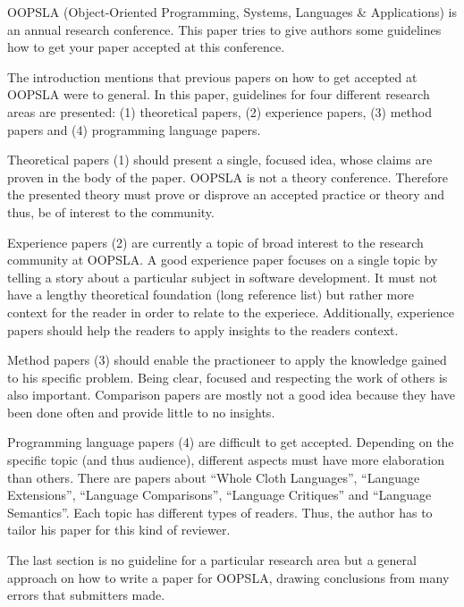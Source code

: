 \documentclass[a4paper,12pt,english]{scrartcl}
\begin{document}
OOPSLA (Object-Oriented Programming, Systems, Languages \& Applications) is an annual research conference. This paper tries to give authors some guidelines how to get your paper accepted at this conference.

The introduction mentions that previous papers on how to get accepted at OOPSLA were to general. In this paper, guidelines for four different research areas are presented: (1) theoretical papers, (2) experience papers, (3) method papers and (4) programming language papers.

Theoretical papers (1) should present a single, focused idea, whose claims are proven in the body of the paper. OOPSLA is not a theory conference. Therefore the presented theory must prove or disprove an accepted practice or theory and thus, be of interest to the community.

Experience papers (2) are currently a topic of broad interest to the research community at OOPSLA. A good experience paper focuses on a single topic by telling a story about a particular subject in software development. It must not have a lengthy theoretical foundation (long reference list) but rather more context for the reader in order to relate to the experiece. Additionally, experience papers should help the readers to apply insights to the readers context.

Method papers (3) should enable the practioneer to apply the knowledge gained to his specific problem. Being clear, focused and respecting the work of others is also important. Comparison papers are mostly not a good idea because they have been done often and provide little to no insights.

Programming language papers (4) are difficult to get accepted. Depending on the specific topic (and thus audience), different aspects must have more elaboration than others. There are papers about \enquote{Whole Cloth Languages}, \enquote{Language Extensions}, \enquote{Language Comparisons}, \enquote{Language Critiques} and \enquote{Language Semantics}. Each topic has different types of readers. Thus, the author has to tailor his paper for this kind of reviewer.

The last section is no guideline for a particular research area but a general approach on how to write a paper for OOPSLA, drawing conclusions from many errors that submitters made.
\end{document}
